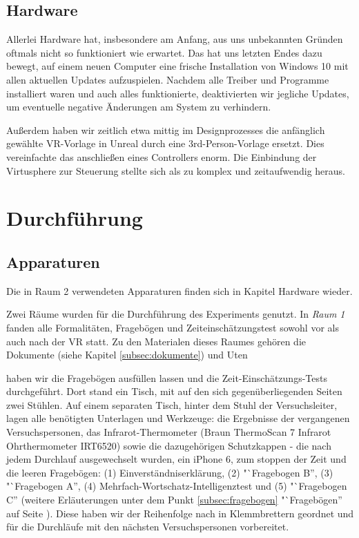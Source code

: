 \documentclass{Bericht}
\begin{document}
		
\label{subsec:hardware}
\subsection{Hardware}

			Allerlei Hardware hat, insbesondere am Anfang, aus uns unbekannten Gründen oftmals nicht so funktioniert wie erwartet. Das hat uns letzten Endes dazu bewegt, auf einem neuen Computer eine frische Installation von Windows 10 mit allen aktuellen Updates aufzuspielen. Nachdem alle Treiber und Programme installiert waren und auch alles funktionierte, deaktivierten wir jegliche Updates, um eventuelle negative Änderungen am System zu verhindern. 
			
			Außerdem haben wir zeitlich etwa mittig im Designprozesses die anfänglich gewählte VR-Vorlage in Unreal durch eine 3rd-Person-Vorlage ersetzt. Dies vereinfachte das anschließen eines Controllers enorm. Die Einbindung der Virtusphere zur Steuerung stellte sich als zu komplex und zeitaufwendig heraus. 
		

\section{Durchführung}
\subsection{Apparaturen}

Die in Raum 2 verwendeten Apparaturen finden sich in Kapitel Hardware wieder. 


Zwei Räume wurden für die Durchführung des Experiments genutzt. In  \textit{Raum 1} fanden alle Formalitäten, Fragebögen und Zeiteinschätzungstest sowohl vor als auch nach der VR statt. Zu den Materialen dieses Raumes gehören die Dokumente (siehe Kapitel \ref{subsec:dokumente}) und Uten

haben wir die Fragebögen ausfüllen lassen und die Zeit-Einschätzungs-Tests durchgeführt. Dort stand ein Tisch, mit auf den sich gegenüberliegenden Seiten zwei Stühlen. Auf einem separaten Tisch, hinter dem Stuhl der Versuchsleiter, lagen alle benötigten Unterlagen und Werkzeuge: die Ergebnisse der vergangenen Versuchspersonen, das Infrarot-Thermometer (Braun ThermoScan 7 Infrarot Ohrthermometer IRT6520) sowie die dazugehörigen Schutzkappen - die nach jedem Durchlauf ausgewechselt wurden, ein iPhone 6, zum stoppen der Zeit und die leeren Fragebögen: (1) Einverständniserklärung, (2)  "`Fragebogen B'', (3) "`Fragebogen A'', (4) Mehrfach-Wortschatz-Intelligenztest und (5) "`Fragebogen C'' (weitere Erläuterungen unter dem Punkt \ref{subsec:fragebogen} "`Fragebögen'' auf Seite \pageref{subsec:fragebogen}). Diese haben wir der Reihenfolge nach in Klemmbrettern geordnet und für die Durchläufe mit den nächsten Versuchspersonen vorbereitet. 
\end{document}
